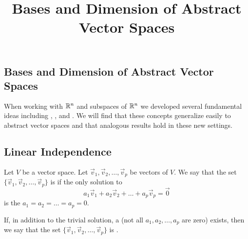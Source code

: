 \documentclass{ximera}
\title{Bases and Dimension of Abstract Vector Spaces} \license{CC BY-NC-SA 4.0}
\begin{document}
\begin{abstract}
\end{abstract}
\maketitle

\begin{onlineOnly}
\section*{Bases and Dimension of Abstract Vector Spaces}
\end{onlineOnly}

When working with $\mathbb{R}^n$ and subspaces of $\mathbb{R}^n$ we developed several fundamental ideas including , ,  and .  We will find that these concepts generalize easily to abstract vector spaces and that analogous results hold in these new settings.
\subsection*{Linear Independence}
\begin{definition}\label{def:linearindependenceabstract}
Let $V$ be a vector space.  Let $\vec{v}_1, \vec{v}_2,\ldots ,\vec{v}_p$ be vectors of $V$.  We say that the set $\{\vec{v}_1, \vec{v}_2,\ldots ,\vec{v}_p\}$ is  if the only solution to 
$$a_1\vec{v}_1+a_2\vec{v}_2+\ldots +a_p\vec{v}_p=\vec{0}$$
is the  $a_1=a_2=\ldots =a_p=0$.

If, in addition to the trivial solution, a  (not all $a_1, a_2,\ldots ,a_p$ are zero) exists, then we say that the set $\{\vec{v}_1, \vec{v}_2,\ldots ,\vec{v}_p\}$ is .
\end{definition}
\end{document}
